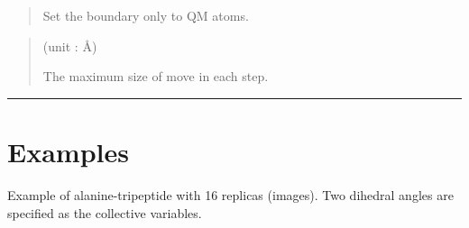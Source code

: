 \documentclass[a4paper,11pt,oneside,english]{sphinxmanual}
\begin{document}
 
\begin{quote}


Set the boundary only to QM atoms.
\end{quote}

 
\begin{quote}

 (unit : \(\text{\AA}\))

The maximum size of move in each step.
\end{quote}


\bigskip\hrule\bigskip



\section{Examples}
\label{\detokenize{15_RPath:examples}}
Example of alanine-tripeptide with 16 replicas (images). Two dihedral
angles are specified as the collective variables.
\end{document}
